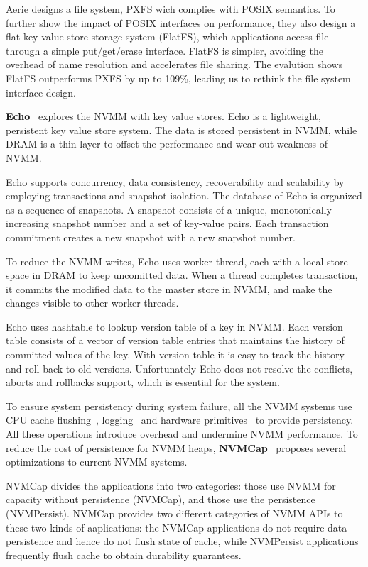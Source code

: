 Aerie designs a file system, PXFS wich complies with POSIX semantics.
To further show the impact of POSIX interfaces on performance, they also design a flat
key-value store storage system (FlatFS), which applications access file
through a simple put/get/erase interface. FlatFS is simpler, avoiding the
overhead of name resolution and accelerates file sharing. The evalution shows FlatFS
outperforms PXFS by up to 109\%, leading us to rethink the file system interface design.

\textbf{Echo}~\cite{echo} explores the NVMM with key value stores.
 Echo is a lightweight,
persistent key value store system. The data is stored persistent in NVMM,
while DRAM is a thin layer to offset the performance and wear-out weakness of
NVMM.

Echo supports concurrency, data consistency, recoverability and scalability
by employing transactions and snapshot isolation. The database of Echo is
organized as a sequence of snapshots. A snapshot consists of a unique, monotonically
increasing snapshot number and a set of key-value pairs. Each transaction
commitment creates a new snapshot with a new snapshot number. 

To reduce the NVMM writes, Echo uses worker thread, each with a local store
space in DRAM to keep uncomitted data.
When a thread completes transaction, it commits the modified
data to the master store in NVMM, and make the changes visible to other
worker threads.

Echo uses hashtable to lookup version table of a key in NVMM. Each version table
consists of a vector of version table entries that maintains the history
of committed values of the key. With version table it is easy to track
the history and roll back to old versions. Unfortunately Echo does not
resolve the conflicts, aborts and rollbacks support, which is essential
for the system.

To ensure system persistency during system failure, all the NVMM systems
use CPU cache flushing~\cite{PMFS, nvheaps}, logging~\cite{PMFS, nvheaps,
mnemosyne} and hardware primitives~\cite{BPFS, PMFS} to provide persistency.
All these operations introduce overhead and undermine NVMM performance.
To reduce the cost of persistence for NVMM heaps, \textbf{NVMCap}~\cite{NVMCap}
 proposes several optimizations to current NVMM systems.

NVMCap divides the applications into two categories: those
use NVMM for capacity without persistence (NVMCap), and those use the
persistence (NVMPersist). NVMCap provides two different
categories of NVMM APIs to these two kinds of aaplications: the NVMCap
applications do not require data persistence and hence do not flush state
of cache, while NVMPersist applications frequently flush cache to obtain
durability guarantees.

